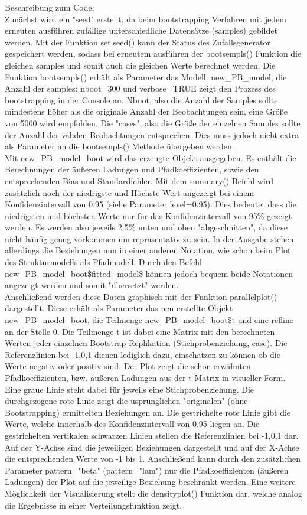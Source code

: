 \documentclass{article}\usepackage[]{graphicx}\usepackage[]{color}
\begin{document}
Beschreibung zum Code:\\
Zunächst wird ein "seed" erstellt, da beim bootstrapping Verfahren mit jedem erneuten ausführen zufällige unterschiedliche Datensätze (samples) gebildet werden. Mit der Funktion set.seed() kann der Status des Zufallsgenerator gespeichert werden, sodass bei erneutem ausführen der bootsempls() Funktion die gleichen samples und somit auch die gleichen Werte berechnet werden. Die Funktion bootsempls() erhält als Parameter das Modell: new\_PB\_model, die Anzahl der samples: nboot=300 und verbose=TRUE zeigt den Prozess des bootstrapping in der Console an. Nboot, also die Anzahl der Samples sollte mindestens höher als die originale Anzahl der Beobachtungen sein, eine Größe von 5000 wird empfohlen. Die "cases", also die Größe der einzelnen Samples sollte der Anzahl der validen Beobachtungen entsprechen. Dies muss jedoch nicht extra als Parameter an die bootsempls() Methode übergeben werden.\\
Mit new\_PB\_model\_boot wird das erzeugte Objekt ausgegeben. Es enthält die Berechnungen der äußeren Ladungen und Pfadkoeffizienten, sowie den entsprechenden Bias und Standardfehler. Mit dem summary() Befehl wird zusätzlich noch der niedrigste und Höchste Wert angezeigt bei einem Konfidenzintervall von 0.95 (siehe Parameter level=0.95). Dies bedeutet dass die niedrigsten und höchsten Werte nur für das Konfidenzintervall von 95\% gezeigt werden. Es werden also jeweils 2.5\% unten und oben "abgeschnitten", da diese nicht häufig genug vorkommen um repräsentativ zu sein. In der Ausgabe stehen allerdings die Beziehungen nun in einer anderen Notation, wie schon beim Plot des Strukturmodells als Pfadmodell. Durch den Befehl new\_PB\_model\_boot\$fitted\_model\$ können jedoch bequem beide Notationen angezeigt werden und somit "übersetzt" werden.\\
Anschließend werden diese Daten graphisch mit der Funktion parallelplot() dargestellt. Diese erhält als Parameter das neu erstellte Objekt new\_PB\_model\_boot, die Teilmenge new\_PB\_model\_boot\$t und eine refline an der Stelle 0. Die Teilmenge t ist dabei eine Matrix mit den berechneten Werten jeder einzelnen Bootstrap Replikation (Stichprobenziehung, case). Die Referenzlinien bei -1,0,1 dienen lediglich dazu, einschätzen zu können ob die Werte negativ oder positiv sind. Der Plot zeigt die schon erwähnten Pfadkoeffizienten, bzw. äußeren Ladungen aus der t Matrix in visueller Form. Eine graue Linie steht dabei für jeweils eine Stichprobenziehung. Die durchgezogene rote Linie zeigt die usprünglichen "originalen" (ohne Bootstrapping) ermittelten Beziehungen an. Die gestrichelte rote Linie gibt die Werte, welche innerhalb des Konfidenzintervall von 0.95 liegen an. Die gestrichelten vertikalen schwarzen Linien stellen die Referenzlinien bei -1,0,1 dar. Auf der Y-Achse sind die jeweiligen Beziehungen dargestellt und auf der X-Achse die entsprechenden Werte von -1 bis 1. Anschließend kann durch den zusätzlichen Parameter pattern="beta" (pattern="lam") nur die Pfadkoeffizienten (äußeren Ladungen) der Plot auf die jeweilige Beziehung beschränkt werden. Eine weitere Möglichkeit der Visualisierung stellt die densityplot() Funktion dar, welche analog die Ergebnisse in einer Verteilungsfunktion zeigt.\\
\end{document}
